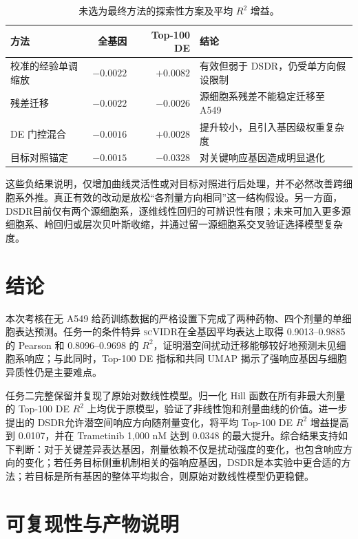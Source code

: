 \documentclass[UTF8,11pt,a4paper,fontset=fandol]{ctexart}
\newcommand{\scvidr}{\textsc{scVIDR}}
\newcommand{\dsdr}{\textsc{DSDR}}
\begin{document}
\begin{table}[H]
\centering
\caption{未选为最终方法的探索性方案及平均 $R^2$ 增益。}
\label{tab:negative}
\begin{tabularx}{\textwidth}{lrrX}
\toprule
方法 & 全基因 & Top-100 DE & 结论 \\
\midrule
校准的经验单调缩放 & $-0.0022$ & $+0.0082$ & 有效但弱于 DSDR，仍受单方向假设限制 \\
残差迁移 & $-0.0022$ & $-0.0026$ & 源细胞系残差不能稳定迁移至 A549 \\
DE 门控混合 & $-0.0016$ & $+0.0028$ & 提升较小，且引入基因级权重复杂度 \\
目标对照锚定 & $-0.0015$ & $-0.0328$ & 对关键响应基因造成明显退化 \\
\bottomrule
\end{tabularx}
\end{table}

这些负结果说明，仅增加曲线灵活性或对目标对照进行后处理，并不必然改善跨细胞系外推。真正有效的改动是放松“各剂量方向相同”这一结构假设。另一方面，\dsdr 目前仅有两个源细胞系，逐维线性回归的可辨识性有限；未来可加入更多源细胞系、岭回归或层次贝叶斯收缩，并通过留一源细胞系交叉验证选择模型复杂度。

\section{结论}

本次考核在无 A549 给药训练数据的严格设置下完成了两种药物、四个剂量的单细胞表达预测。任务一的条件特异 \scvidr 在全基因平均表达上取得 0.9013--0.9885 的 Pearson 和 0.8096--0.9698 的 $R^2$，证明潜空间扰动迁移能够较好地预测未见细胞系响应；与此同时，Top-100 DE 指标和共同 UMAP 揭示了强响应基因与细胞异质性仍是主要难点。

任务二完整保留并复现了原始对数线性模型。归一化 Hill 函数在所有非最大剂量的 Top-100 DE $R^2$ 上均优于原模型，验证了非线性饱和剂量曲线的价值。进一步提出的 \dsdr 允许潜空间响应方向随剂量变化，将平均 Top-100 DE $R^2$ 增益提高到 0.0107，并在 Trametinib 1,000 nM 达到 0.0348 的最大提升。综合结果支持如下判断：对于关键差异表达基因，剂量依赖不仅是扰动强度的变化，也包含响应方向的变化；若任务目标侧重机制相关的强响应基因，\dsdr 是本实验中更合适的方法；若目标是所有基因的整体平均拟合，则原始对数线性模型仍更稳健。

\section{可复现性与产物说明}
\end{document}
